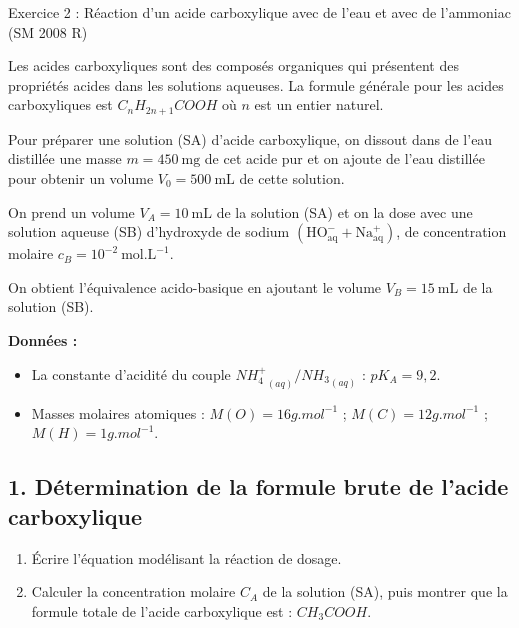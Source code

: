\documentclass[12pt, french]{article}
\begin{document}
\begin{Box2}{Exercice 2 :  Réaction d’un acide carboxylique avec de l’eau et avec de l’ammoniac (SM 2008 R)}

Les acides carboxyliques sont des composés organiques qui présentent des propriétés acides dans les solutions aqueuses.  
La formule générale pour les acides carboxyliques est $C_nH_{2n+1}COOH$ où $n$ est un entier naturel.

Pour préparer une solution (SA) d’acide carboxylique, on dissout dans de l’eau distillée une masse $m = 450\ \text{mg}$ de cet acide pur et on ajoute de l’eau distillée pour obtenir un volume $V_0 = 500\ \text{mL}$ de cette solution.  

On prend un volume $V_A = 10\ \text{mL}$ de la solution (SA) et on la dose avec une solution aqueuse (SB) d’hydroxyde de sodium $(\text{HO}^-_\text{aq} + \text{Na}^+_\text{aq})$, de concentration molaire $c_B = 10^{-2}\ \text{mol.L}^{-1}$.  

On obtient l’équivalence acido-basique en ajoutant le volume $V_B = 15\ \text{mL}$ de la solution (SB).

\textbf{Données :}
\begin{itemize}
  \item La constante d’acidité du couple ${NH_4^+}_{(aq)} / {NH_3}_{(aq)}$ : $pK_A = 9,2$.
    \item Masses molaires atomiques : $M(O) = 16 g.mol^{-1}$ ; $M(C) = 12 g.mol^{-1}$ ; $M(H) = 1g.mol^{-1}$.
\end{itemize}

\subsection*{1. Détermination de la formule brute de l’acide carboxylique}
\begin{enumerate}
    \item Écrire l’équation modélisant la réaction de dosage.
    \item Calculer la concentration molaire $C_A$ de la solution (SA), puis montrer que la formule totale de l’acide carboxylique est : $CH_3COOH$.
\end{enumerate}


\end{Box2}
\end{document}
